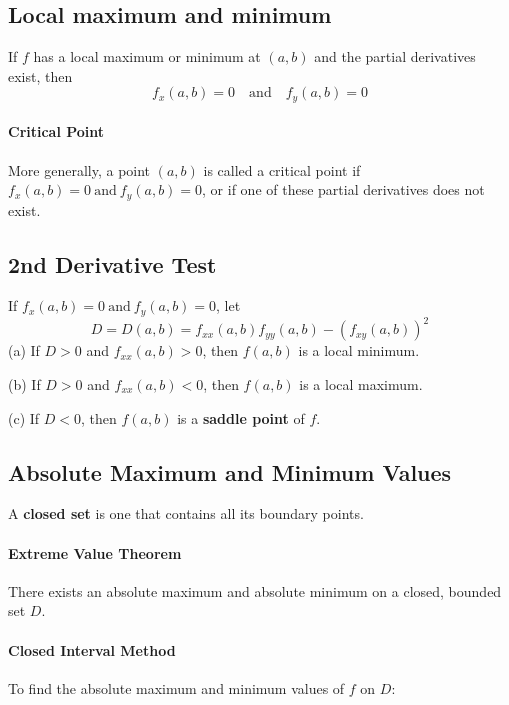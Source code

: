 \documentclass{report}  %
\begin{document}
\subsection*{Local maximum and minimum}
If $f$ has a local maximum or minimum at $(a, b)$ and the partial derivatives exist, then 
\begin{equation}
	f_x (a, b) = 0 \quad \text{and} \quad f_y (a, b) = 0
\end{equation} 

\paragraph{Critical Point} 
More generally, a point $(a, b)$ is called a critical point if $f_x (a, b) = 0 \  \text{and} \  f_y (a, b) = 0$, 
or if one of these partial derivatives does not exist. 

\subsection*{2nd Derivative Test}
If $f_x (a, b) = 0 \  \text{and} \  f_y (a, b) = 0$, let 
\begin{equation}
	D = D(a, b) = f_{xx}(a, b) f_{yy}(a, b) - (f_{xy}(a,b))^2
\end{equation}
(a) If $D > 0$ and $f_{xx}(a, b) > 0$, then $f(a, b)$ is a local minimum.

(b) If $D > 0$ and $f_{xx}(a, b) < 0$, then $f(a, b)$ is a local maximum.

(c) If $D < 0$, then $f(a, b)$ is a \textbf{saddle point} of $f$. 

\subsection*{Absolute Maximum and Minimum Values}
A \textbf{closed set} is one that contains all its boundary points. 

\paragraph{Extreme Value Theorem} 
There exists an absolute maximum and absolute minimum on a closed, bounded set $D$. 

\paragraph{Closed Interval Method}
To find the absolute maximum and minimum values of $f$ on $D$: \\
\end{document}

